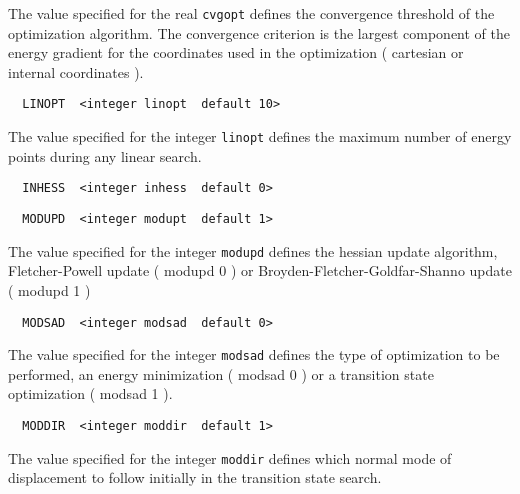 The value specified for the real \verb+cvgopt+ defines the convergence
threshold of the optimization algorithm. The convergence criterion is
the largest component of the energy gradient for the coordinates used
in the optimization ( cartesian or internal coordinates ).

\begin{verbatim}
  LINOPT  <integer linopt  default 10>
\end{verbatim}

The value specified for the integer \verb+linopt+ defines the maximum 
number of energy points during any linear search. 

\begin{verbatim}
  INHESS  <integer inhess  default 0>
\end{verbatim}

\begin{verbatim}
  MODUPD  <integer modupt  default 1>
\end{verbatim}

The value specified for the integer \verb+modupd+ defines the hessian 
update algorithm, Fletcher-Powell update ( modupd 0 ) or
Broyden-Fletcher-Goldfar-Shanno update ( modupd 1 )

\begin{verbatim}
  MODSAD  <integer modsad  default 0>
\end{verbatim}

The value specified for the integer \verb+modsad+ defines the type   
of optimization to be performed, an energy minimization ( modsad 0 )
or a transition state optimization ( modsad 1 ).


\begin{verbatim}
  MODDIR  <integer moddir  default 1>
\end{verbatim}

The value specified for the integer \verb+moddir+ defines    
which normal mode of displacement to follow initially in the
transition state search.
